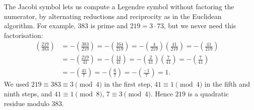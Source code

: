 The Jacobi symbol lets us compute a Legendre symbol without factoring the numerator, by alternating reductions and reciprocity as in the Euclidean algorithm. For example, $383$ is prime and $219 = 3 \cdot 73$, but we never need this factorisation:
\begin{equation*}
    \begin{aligned}
        \left(\frac{219}{383}\right) &= -\left(\frac{383}{219}\right) = -\left(\frac{164}{219}\right) = -\left(\frac{4}{219}\right)\left(\frac{41}{219}\right) = -\left(\frac{41}{219}\right)\\
        &= -\left(\frac{219}{41}\right) = -\left(\frac{14}{41}\right) = -\left(\frac{2}{41}\right)\left(\frac{7}{41}\right) = -\left(\frac{7}{41}\right)\\
        &= -\left(\frac{41}{7}\right) = -\left(\frac{6}{7}\right) = -\left(\frac{-1}{7}\right) = 1.
    \end{aligned}
\end{equation*}
We used $219 \equiv 383 \equiv 3 \pmod 4$ in the first step, $41 \equiv 1 \pmod 4$ in the fifth and ninth steps, and $41 \equiv 1 \pmod 8$, $7 \equiv 3 \pmod 4$. Hence $219$ is a quadratic residue modulo $383$.

